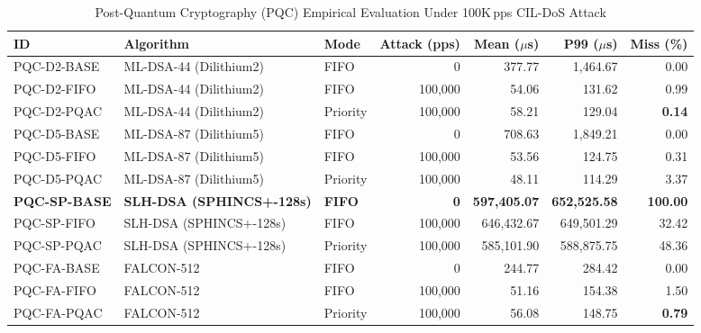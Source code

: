 \documentclass{ieeeaccess}
\begin{document}
\begin{table}[t]
\caption{Post-Quantum Cryptography (PQC) Empirical Evaluation Under 100K\,pps CIL-DoS Attack}
\label{tab:pqc_results}
\centering
\small
\begin{tabular}{lllrrrr}
\toprule
\textbf{ID} & \textbf{Algorithm} & \textbf{Mode} & \textbf{Attack (pps)} & \textbf{Mean ($\mu$s)} & \textbf{P99 ($\mu$s)} & \textbf{Miss (\%)} \\
\midrule
PQC-D2-BASE & ML-DSA-44 (Dilithium2) & FIFO & 0 & 377.77 & 1,464.67 & 0.00 \\
PQC-D2-FIFO & ML-DSA-44 (Dilithium2) & FIFO & 100,000 & 54.06 & 131.62 & 0.99 \\
PQC-D2-PQAC & ML-DSA-44 (Dilithium2) & Priority & 100,000 & 58.21 & 129.04 & \textbf{0.14} \\
\midrule
PQC-D5-BASE & ML-DSA-87 (Dilithium5) & FIFO & 0 & 708.63 & 1,849.21 & 0.00 \\
PQC-D5-FIFO & ML-DSA-87 (Dilithium5) & FIFO & 100,000 & 53.56 & 124.75 & 0.31 \\
PQC-D5-PQAC & ML-DSA-87 (Dilithium5) & Priority & 100,000 & 48.11 & 114.29 & 3.37 \\
\midrule
\textbf{PQC-SP-BASE} & \textbf{SLH-DSA (SPHINCS+-128s)} & \textbf{FIFO} & \textbf{0} & \textbf{597,405.07} & \textbf{652,525.58} & \textbf{100.00} \\
PQC-SP-FIFO & SLH-DSA (SPHINCS+-128s) & FIFO & 100,000 & 646,432.67 & 649,501.29 & 32.42 \\
PQC-SP-PQAC & SLH-DSA (SPHINCS+-128s) & Priority & 100,000 & 585,101.90 & 588,875.75 & 48.36 \\
\midrule
PQC-FA-BASE & FALCON-512 & FIFO & 0 & 244.77 & 284.42 & 0.00 \\
PQC-FA-FIFO & FALCON-512 & FIFO & 100,000 & 51.16 & 154.38 & 1.50 \\
PQC-FA-PQAC & FALCON-512 & Priority & 100,000 & 56.08 & 148.75 & \textbf{0.79} \\
\bottomrule
\end{tabular}
\end{table}
\end{document}
